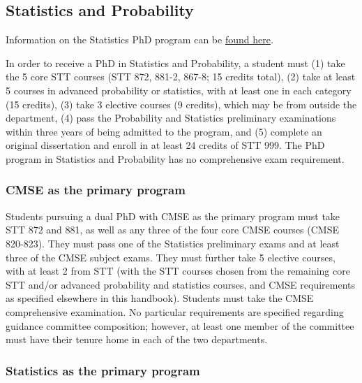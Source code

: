 \subsection{Statistics and Probability}

Information on the Statistics PhD program can be
\href{https://www.stt.msu.edu/Graduate_Program/handbook/PHDREQ.pdf}{found
  here}.

In order to receive a PhD in Statistics and Probability, a student
must (1) take the 5 core STT courses (STT 872, 881-2, 867-8; 15
credits total), (2) take at least 5 courses in advanced probability or
statistics, with at least one in each category (15 credits), (3) take
3 elective courses (9 credits), which may be from outside the
department, (4) pass the Probability and Statistics preliminary
examinations within three years of being admitted to the program, and
(5) complete an original dissertation and enroll in at least 24
credits of STT 999.  The PhD program in Statistics and Probability has
no comprehensive exam requirement.

\subsubsection{CMSE as the primary program}

Students pursuing a dual PhD with CMSE as the primary program must
take STT 872 and 881, as well as any three of the four core CMSE
courses (CMSE 820-823).  They must pass one of the Statistics
preliminary exams and at least three of the CMSE subject exams.  They
must further take 5 elective courses, with at least 2 from STT (with
the STT courses chosen from the remaining core STT and/or advanced
probability and statistics courses, and CMSE requirements as specified
elsewhere in this handbook).  Students must take the CMSE
comprehensive examination.  No particular requirements are specified
regarding guidance committee composition; however, at least one member
of the committee must have their tenure home in each of the two
departments.

\subsubsection{Statistics as the primary program}

